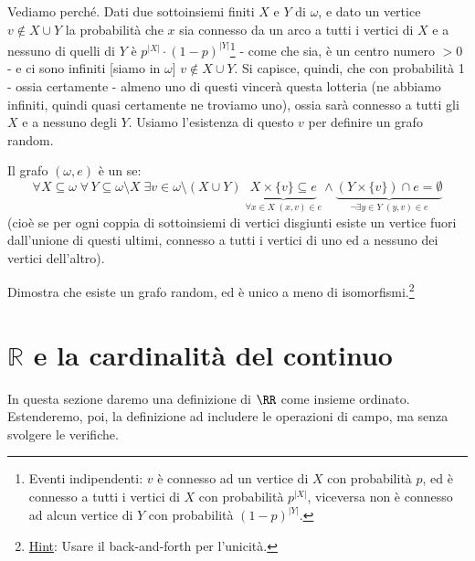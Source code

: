 \documentclass[11pt]{scrartcl}
\begin{document}
Vediamo perché. Dati due sottoinsiemi finiti $X$ e $Y$ di $\omega$, e dato un vertice $v \not \in X \cup Y$ la probabilità che $x$ sia connesso da un arco a tutti i vertici di $X$ e a nessuno di quelli di $Y$
è $p^{|X|} \cdot (1 - p)^{|Y|}$\footnote{Eventi indipendenti: $v$ è connesso ad un vertice di $X$ con probabilità $p$, ed è connesso a tutti i vertici di $X$ con probabilità $p^{|X|}$, viceversa non è connesso ad alcun vertice di $Y$ con
probabilità $(1-p)^{|Y|}$.} - come che sia, è un centro numero $>0$ - e ci sono infiniti [siamo in $\omega$] $v \not \in X \cup Y$. Si capisce, quindi, che con probabilità 1 - ossia certamente - almeno uno di questi vincerà questa lotteria (ne abbiamo infiniti, quindi quasi certamente ne troviamo uno), ossia sarà connesso 
a tutti gli $X$ e a nessuno degli $Y$. Usiamo l'esistenza di questo $v$ per definire un grafo random.

\begin{definition}
	Il grafo $(\omega,e)$ è un  se:
	\[ \forall X \subseteq \omega \; \forall \,Y \subseteq \omega\setminus X \; \exists v \in \omega \setminus(X \cup Y) \; \underbrace{X \times \{v\} \subseteq e}_{\forall x\in X \; (x,v) \in e} \land \underbrace{(Y \times \{v\}) \cap e = \emptyset}_{\neg\exists y \in Y \; (y,v) \in e}
		\]
	(cioè se per ogni coppia di sottoinsiemi di vertici disgiunti esiste un vertice fuori dall'unione di questi ultimi, connesso a tutti i vertici di uno ed a nessuno dei vertici dell'altro).
\end{definition}

\begin{exercise}
	Dimostra che esiste un grafo random, ed è unico a meno di isomorfismi.\footnote{\underline{Hint}: Usare il back-and-forth per l'unicità.}
\end{exercise}

\begin{soln}
	
\end{soln}

\newpage
\section{\texorpdfstring{$\mathbb{R}$ e la cardinalità del continuo}{R e la cardinalità del continuo}}

In questa sezione daremo una definizione di $\RR$ come insieme ordinato. Estenderemo, poi, la definizione ad includere le operazioni di campo, ma senza svolgere le verifiche.
\end{document}
